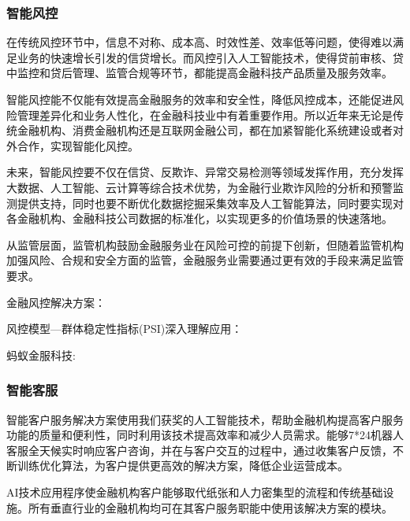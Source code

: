 \documentclass[letterpaper,10pt,english]{sphinxmanual}
\begin{document}
\subsubsection{智能风控}
\label{\detokenize{chapter_AI+Finance/AI_Risk_Management:id1}}\label{\detokenize{chapter_AI+Finance/AI_Risk_Management::doc}}
在传统风控环节中，信息不对称、成本高、时效性差、效率低等问题，使得难以满足业务的快速增长引发的信贷增长。而风控引入人工智能技术，使得贷前审核、贷中监控和贷后管理、监管合规等环节，都能提高金融科技产品质量及服务效率。

智能风控能不仅能有效提高金融服务的效率和安全性，降低风控成本，还能促进风险管理差异化和业务人性化，在金融科技业中有着重要作用。所以近年来无论是传统金融机构、消费金融机构还是互联网金融公司，都在加紧智能化系统建设或者对外合作，实现智能化风控。

未来，智能风控要不仅在信贷、反欺诈、异常交易检测等领域发挥作用，充分发挥大数据、人工智能、云计算等综合技术优势，为金融行业欺诈风险的分析和预警监测提供支持，同时也要不断优化数据挖掘采集效率及人工智能算法，同时要实现对各金融机构、金融科技公司数据的标准化，以实现更多的价值场景的快速落地。

从监管层面，监管机构鼓励金融服务业在风险可控的前提下创新，但随着监管机构加强风险、合规和安全方面的监管，金融服务业需要通过更有效的手段来满足监管要求。%
\begin{footnote}[1120]\sphinxAtStartFootnote
{}
%
\end{footnote}

金融风控解决方案：

风控模型—群体稳定性指标(PSI)深入理解应用：

蚂蚁金服科技: 


\subsubsection{智能客服}
\label{\detokenize{chapter_AI+Finance/AI_customer_service:id1}}\label{\detokenize{chapter_AI+Finance/AI_customer_service::doc}}
智能客户服务解决方案使用我们获奖的人工智能技术，帮助金融机构提高客户服务功能的质量和便利性，同时利用该技术提高效率和减少人员需求。能够7*24机器人客服全天候实时响应客户咨询，并在与客户交互的过程中，通过收集客户反馈，不断训练优化算法，为客户提供更高效的解决方案，降低企业运营成本。%
\begin{footnote}[1121]\sphinxAtStartFootnote
{}
%
\end{footnote}AI技术应用程序使金融机构客户能够取代纸张和人力密集型的流程和传统基础设施。所有垂直行业的金融机构均可在其客户服务职能中使用该解决方案的模块。
\end{document}
